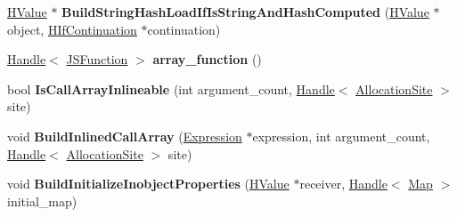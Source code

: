 \begin{DoxyCompactItemize}
\item 
\hyperlink{classv8_1_1internal_1_1_h_value}{H\+Value} $\ast$ {\bfseries Build\+String\+Hash\+Load\+If\+Is\+String\+And\+Hash\+Computed} (\hyperlink{classv8_1_1internal_1_1_h_value}{H\+Value} $\ast$object, \hyperlink{classv8_1_1internal_1_1_h_if_continuation}{H\+If\+Continuation} $\ast$continuation)\hypertarget{classv8_1_1internal_1_1_h_optimized_graph_builder_a2b2b2a436ae9c684ea065a2749e827f4}{}\label{classv8_1_1internal_1_1_h_optimized_graph_builder_a2b2b2a436ae9c684ea065a2749e827f4}

\item 
\hyperlink{classv8_1_1internal_1_1_handle}{Handle}$<$ \hyperlink{classv8_1_1internal_1_1_j_s_function}{J\+S\+Function} $>$ {\bfseries array\+\_\+function} ()\hypertarget{classv8_1_1internal_1_1_h_optimized_graph_builder_a6175f83e6f19c1c87db1f2aebc5484da}{}\label{classv8_1_1internal_1_1_h_optimized_graph_builder_a6175f83e6f19c1c87db1f2aebc5484da}

\item 
bool {\bfseries Is\+Call\+Array\+Inlineable} (int argument\+\_\+count, \hyperlink{classv8_1_1internal_1_1_handle}{Handle}$<$ \hyperlink{classv8_1_1internal_1_1_allocation_site}{Allocation\+Site} $>$ site)\hypertarget{classv8_1_1internal_1_1_h_optimized_graph_builder_a4bec54804f3d27fbddedced1c5aa420a}{}\label{classv8_1_1internal_1_1_h_optimized_graph_builder_a4bec54804f3d27fbddedced1c5aa420a}

\item 
void {\bfseries Build\+Inlined\+Call\+Array} (\hyperlink{classv8_1_1internal_1_1_expression}{Expression} $\ast$expression, int argument\+\_\+count, \hyperlink{classv8_1_1internal_1_1_handle}{Handle}$<$ \hyperlink{classv8_1_1internal_1_1_allocation_site}{Allocation\+Site} $>$ site)\hypertarget{classv8_1_1internal_1_1_h_optimized_graph_builder_ae6df995e48e6060b13f8765f5f6b9b84}{}\label{classv8_1_1internal_1_1_h_optimized_graph_builder_ae6df995e48e6060b13f8765f5f6b9b84}

\item 
void {\bfseries Build\+Initialize\+Inobject\+Properties} (\hyperlink{classv8_1_1internal_1_1_h_value}{H\+Value} $\ast$receiver, \hyperlink{classv8_1_1internal_1_1_handle}{Handle}$<$ \hyperlink{classv8_1_1internal_1_1_map}{Map} $>$ initial\+\_\+map)\hypertarget{classv8_1_1internal_1_1_h_optimized_graph_builder_a9190d06d5157a932a10827092c1d1fe5}{}\label{classv8_1_1internal_1_1_h_optimized_graph_builder_a9190d06d5157a932a10827092c1d1fe5}


\end{DoxyCompactItemize}
